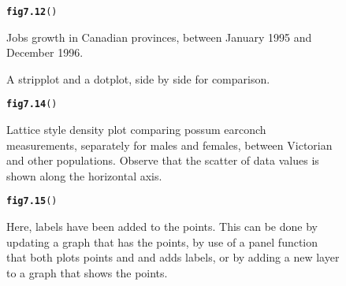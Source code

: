 \documentclass[12pt, a4paper,  BCOR=8.25mm, DIV=15]{scrartcl}\usepackage[]{graphicx}\usepackage[]{color}
\makeatletter
\newcommand{\hlstd}[1]{\textcolor[rgb]{0.345,0.345,0.345}{#1}}%
\newcommand{\hlkwd}[1]{\textcolor[rgb]{0.737,0.353,0.396}{\textbf{#1}}}%
\newenvironment{kframe}{%
 \def\at@end@of@kframe{}%
 \ifinner\ifhmode%
  \def\at@end@of@kframe{\end{minipage}}%
  \begin{minipage}{\columnwidth}%
 \fi\fi%
 \def\FrameCommand##1{\hskip\@totalleftmargin \hskip-\fboxsep
 \colorbox{shadecolor}{##1}\hskip-\fboxsep
     \hskip-\linewidth \hskip-\@totalleftmargin \hskip\columnwidth}%
 \MakeFramed {\advance\hsize-\width
   \@totalleftmargin\z@ \linewidth\hsize
   \@setminipage}}%
 {\par\unskip\endMakeFramed%
 \at@end@of@kframe}
\newenvironment{knitrout}{}{} %
\makeatother
\begin{document}
\begin{figure}[ht]
\begin{knitrout}
\color{fgcolor}\begin{kframe}
\begin{alltt}
\hlkwd{fig7.12}\hlstd{()}
\end{alltt}


{\ttfamily\noindent\bfseries{}}\end{kframe}
\end{knitrout}
\caption{Jobs growth in Canadian provinces, between January 1995
  and December 1996.}\label{fig:jobsplot}
\end{figure}

\begin{figure}[ht]

\caption{A stripplot and a dotplot, side by side for comparison.}
\end{figure}

\begin{figure}[ht]
\begin{knitrout}
\color{fgcolor}\begin{kframe}
\begin{alltt}
\hlkwd{fig7.14}\hlstd{()}
\end{alltt}


{\ttfamily\noindent\bfseries{}}\end{kframe}
\end{knitrout}
\caption{Lattice style density plot comparing possum earconch
    measurements, separately for males and females, between Victorian
    and other populations. Observe that the scatter of data values is
shown along the horizontal axis.}\label{fig:possumdens}
\end{figure}

\begin{figure}[ht]
\begin{knitrout}
\color{fgcolor}\begin{kframe}
\begin{alltt}
\hlkwd{fig7.15}\hlstd{()}
\end{alltt}


{\ttfamily\noindent\bfseries{}}\end{kframe}
\end{knitrout}
\caption{Here, labels have been added to the points. This can be
  done by updating a graph that has the points, by use of a panel
  function that both plots points and and adds labels, or by adding a
  new layer to a graph that shows the points.}\label{fig:layer}
\end{figure}
\end{document}
